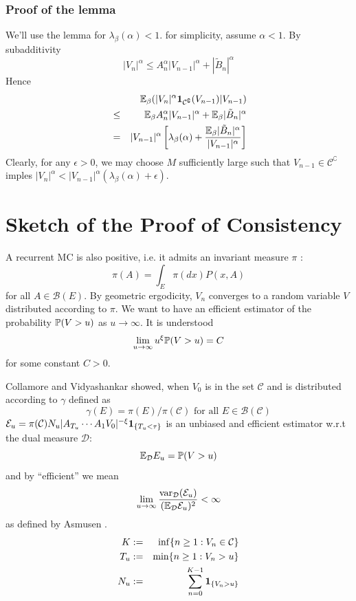 \documentclass{beamer}
\begin{document}
\begin{frame}
  \frametitle{Proof of the lemma}
  We'll use the lemma for $\lambda_\beta(\alpha) < 1$. for
  simplicity, assume $\alpha < 1$. By subadditivity
  \[
  |V_n|^\alpha \leq A_n^\alpha |V_{n-1}|^\alpha + |\tilde B_n|^\alpha
  \]
  Hence
  \begin{eqnarray*}
    && \E_\beta (|V_n|^\alpha \I{\mathcal C^\complement}(V_{n-1})
    | V_{n-1}) \\
    &\leq& \E_\beta A_n^\alpha |V_{n-1}|^\alpha +
    \E_\beta |\tilde B_n|^\alpha \\
    &=& |V_{n-1}|^\alpha \left[
      \lambda_\beta(\alpha) + {
        \E_\beta |\tilde B_n|^\alpha
        \over
        |V_{n-1}|^\alpha
      }
    \right]
  \end{eqnarray*}
  Clearly, for any $\epsilon > 0$, we may choose $M$ sufficiently
  large such that $V_{n-1} \in \mathcal C^\complement$ imples
  $|V_n|^\alpha < |V_{n-1}|^\alpha (\lambda_\beta (\alpha) + \epsilon)$.
\end{frame}

\section{Sketch of the Proof of Consistency}
\begin{frame}
  A recurrent MC is also positive, i.e. it admits an invariant
  measure $\pi$ \cite{Meyn:2009:MCS:1550713}:
  \[
  \pi(A) = \int_E \pi(dx) P(x, A)
  \]
  for all $A \in \mathcal B(E)$.
  By geometric ergodicity, $V_n$ converges to a random variable $V$
  distributed according to $\pi$. We want to have an efficient estimator of the
  probability $\P(V > u)$ as $u \to \infty$. It is understood
  \[
   \lim_{u \to \infty} u^\xi \P(V > u) = C
  \]
  for some constant $C > 0$.
\end{frame}

\begin{frame}
  Collamore and Vidyashankar \cite{collamore2014} showed, when
  $V_0$ is in the set $\mathcal C$ and is distributed according to
  $\gamma$ defined as
  \[
  \gamma(E) = \pi(E)/\pi(\mathcal C)\text{ for all } E \in \mathcal B(\mathcal C)
  \]
  $\mathcal E_u = \pi(\mathcal C) N_u |A_{T_u} \cdots A_{1}
  V_0|^{-\xi}\1{T_u < \tau}$ is an unbiased and efficient estimator
  w.r.t the dual measure $\mathcal D$:
  \[
  \E_{\mathcal D} E_u = \P(V > u)
  \]
  and by ``efficient'' we mean
  \[
  \lim_{u \to \infty} {
    \var_{\mathcal D}(\mathcal E_u)
    \over
    (\E_{\mathcal D} \mathcal E_u)^2
  } < \infty
  \]
  as defined by Asmusen \cite{opac-b1123521}.
  \begin{eqnarray*}
    K &:=& \inf\{n \geq 1: V_n \in \mathcal C\} \\
    T_u &:=& \min\{n \geq 1: V_n > u\} \\
    N_u &:=& \sum_{n=0}^{K-1} \1{V_n > u}
  \end{eqnarray*}
\end{frame}
\end{document}
